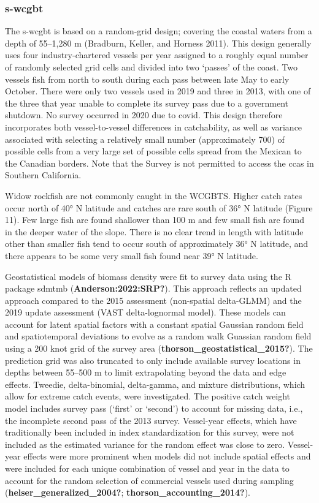 \documentclass[
]{scrartcl}
\begin{document}
\subsubsection{\texorpdfstring{\acrlong{s-wcgbt}}{}}\label{section-2}

The \gls{s-wcgbt} is based on a random-grid design; covering the coastal
waters from a depth of 55--1,280 m (Bradburn, Keller, and Horness 2011).
This design generally uses four industry-chartered vessels per year
assigned to a roughly equal number of randomly selected grid cells and
divided into two `passes' of the coast. Two vessels fish from north to
south during each pass between late May to early October. There were
only two vessels used in 2019 and three in 2013, with one of the three
that year unable to complete its survey pass due to a government
shutdown. No survey occurred in 2020 due to \gls{covid}. This design
therefore incorporates both vessel-to-vessel differences in
catchability, as well as variance associated with selecting a relatively
small number (approximately 700) of possible cells from a very large set
of possible cells spread from the Mexican to the Canadian borders. Note
that the Survey is not permitted to access the \glspl{cca} in Southern
California.

Widow rockfish are not commonly caught in the WCGBTS. Higher catch rates
occur north of 40° N latitude and catches are rare south of 36° N
latitude (Figure 11). Few large fish are found shallower than 100 m and
few small fish are found in the deeper water of the slope. There is no
clear trend in length with latitude other than smaller fish tend to
occur south of approximately 36° N latitude, and there appears to be
some very small fish found near 39° N latitude.

Geostatistical models of biomass density were fit to survey data using
the R package \gls{sdmtmb} (\textbf{Anderson:2022:SRP?}). This approach
reflects an updated approach compared to the 2015 assessment
(non-spatial delta-GLMM) and the 2019 update assessment (VAST
delta-lognormal model). These models can account for latent spatial
factors with a constant spatial Gaussian random field and spatiotemporal
deviations to evolve as a random walk Guassian random field using a 200
knot grid of the survey area (\textbf{thorson\_geostatistical\_2015?}).
The prediction grid was also truncated to only include available survey
locations in depths between 55--500 m to limit extrapolating beyond the
data and edge effects. Tweedie, delta-binomial, delta-gamma, and mixture
distributions, which allow for extreme catch events, were investigated.
The positive catch weight model includes survey pass (`first' or
`second') to account for missing data, i.e., the incomplete second pass
of the 2013 survey. Vessel-year effects, which have traditionally been
included in index standardization for this survey, were not included as
the estimated variance for the random effect was close to zero.
Vessel-year effects were more prominent when models did not include
spatial effects and were included for each unique combination of vessel
and year in the data to account for the random selection of commercial
vessels used during sampling (\textbf{helser\_generalized\_2004?};
\textbf{thorson\_accounting\_2014?}).
\end{document}
